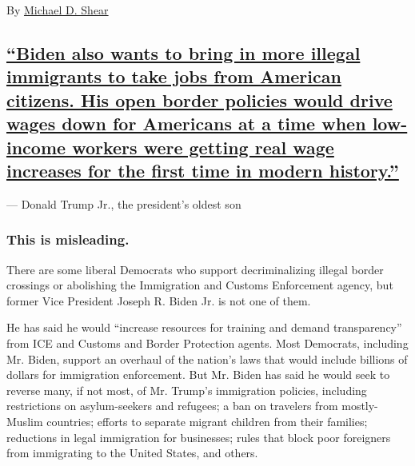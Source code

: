 By \href{https://www.nytimes3xbfgragh.onion/by/michael-d-shear}{Michael
D. Shear}

\hypertarget{biden-also-wants-to-bring-in-more-illegal-immigrants-to-take-jobs-from-american-citizens-his-open-border-policies-would-drive-wages-down-for-americans-at-a-time-when-low-income-workers-were-getting-real-wage-increases-for-the-first-time-in-modern-history}{%
\subsection{\texorpdfstring{\protect\hyperlink{biden-also-wants-to-bring-in-more-illegal-immigrants-to-take-jobs-from-american-citizens-his-open-border-policies-would-drive-wa}{``Biden
also wants to bring in more illegal immigrants to take jobs from
American citizens. His open border policies would drive wages down for
Americans at a time when low-income workers were getting real wage
increases for the first time in modern
history.''}}{``Biden also wants to bring in more illegal immigrants to take jobs from American citizens. His open border policies would drive wages down for Americans at a time when low-income workers were getting real wage increases for the first time in modern history.''}}\label{biden-also-wants-to-bring-in-more-illegal-immigrants-to-take-jobs-from-american-citizens-his-open-border-policies-would-drive-wages-down-for-americans-at-a-time-when-low-income-workers-were-getting-real-wage-increases-for-the-first-time-in-modern-history}}

--- Donald Trump Jr., the president's oldest son

\hypertarget{this-is-misleading-}{%
\subsubsection{This is misleading. }\label{this-is-misleading-}}

There are some liberal Democrats who support decriminalizing illegal
border crossings or abolishing the Immigration and Customs Enforcement
agency, but former Vice President Joseph R. Biden Jr. is not one of
them.

He has said he would ``increase resources for training and demand
transparency'' from ICE and Customs and Border Protection agents. Most
Democrats, including Mr. Biden, support an overhaul of the nation's laws
that would include billions of dollars for immigration enforcement. But
Mr. Biden has said he would seek to reverse many, if not most, of Mr.
Trump's immigration policies, including restrictions on asylum-seekers
and refugees; a ban on travelers from mostly-Muslim countries; efforts
to separate migrant children from their families; reductions in legal
immigration for businesses; rules that block poor foreigners from
immigrating to the United States, and others.


